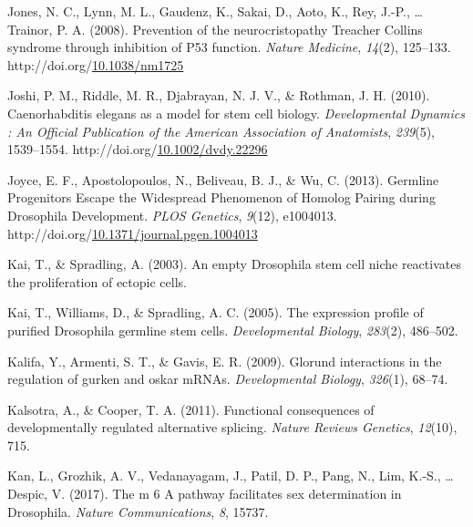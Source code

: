 \documentclass[12pt,oneside]{reedthesis}
\newlength{\cslhangindent}
\newenvironment{CSLReferences}[2] %
 {%
  \setlength{\parindent}{0pt}
  \ifodd #1 \everypar{\setlength{\hangindent}{\cslhangindent}}\ignorespaces\fi
  \ifnum #2 > 0
  \setlength{\parskip}{#2\baselineskip}
  \fi
 }%
 {}
\begin{document}
\begin{CSLReferences}{1}{0}
\leavevmode{}%
Jones, N. C., Lynn, M. L., Gaudenz, K., Sakai, D., Aoto, K., Rey, J.-P., \ldots{} Trainor, P. A. (2008). Prevention of the neurocristopathy {Treacher Collins} syndrome through inhibition of P53 function. \emph{Nature Medicine}, \emph{14}(2), 125--133. http://doi.org/\href{https://doi.org/10.1038/nm1725}{10.1038/nm1725}

\leavevmode{}%
Joshi, P. M., Riddle, M. R., Djabrayan, N. J. V., \& Rothman, J. H. (2010). Caenorhabditis elegans as a model for stem cell biology. \emph{Developmental Dynamics : An Official Publication of the American Association of Anatomists}, \emph{239}(5), 1539--1554. http://doi.org/\href{https://doi.org/10.1002/dvdy.22296}{10.1002/dvdy.22296}

\leavevmode{}%
Joyce, E. F., Apostolopoulos, N., Beliveau, B. J., \& Wu, C. (2013). Germline {Progenitors Escape} the {Widespread Phenomenon} of {Homolog Pairing} during {Drosophila Development}. \emph{PLOS Genetics}, \emph{9}(12), e1004013. http://doi.org/\href{https://doi.org/10.1371/journal.pgen.1004013}{10.1371/journal.pgen.1004013}

\leavevmode{}%
Kai, T., \& Spradling, A. (2003). An empty {Drosophila} stem cell niche reactivates the proliferation of ectopic cells.

\leavevmode{}%
Kai, T., Williams, D., \& Spradling, A. C. (2005). The expression profile of purified {Drosophila} germline stem cells. \emph{Developmental Biology}, \emph{283}(2), 486--502.

\leavevmode{}%
Kalifa, Y., Armenti, S. T., \& Gavis, E. R. (2009). Glorund interactions in the regulation of gurken and oskar {mRNAs}. \emph{Developmental Biology}, \emph{326}(1), 68--74.

\leavevmode{}%
Kalsotra, A., \& Cooper, T. A. (2011). Functional consequences of developmentally regulated alternative splicing. \emph{Nature Reviews Genetics}, \emph{12}(10), 715.

\leavevmode{}%
Kan, L., Grozhik, A. V., Vedanayagam, J., Patil, D. P., Pang, N., Lim, K.-S., \ldots{} Despic, V. (2017). The m 6 {A} pathway facilitates sex determination in {Drosophila}. \emph{Nature Communications}, \emph{8}, 15737.


\end{CSLReferences}
\end{document}
